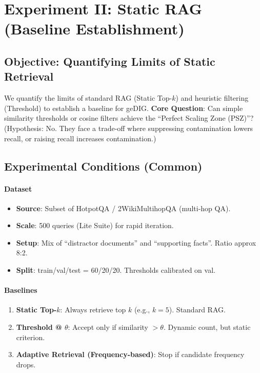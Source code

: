 \documentclass[12pt]{article}
\begin{document}
\section{Experiment II: Static RAG (Baseline Establishment)}
\label{sec:rag_experiment}

\subsection{Objective: Quantifying Limits of Static Retrieval}
We quantify the limits of standard RAG (Static Top-$k$) and heuristic filtering (Threshold) to establish a baseline for geDIG.
\textbf{Core Question}: Can simple similarity thresholds or cosine filters achieve the ``Perfect Scaling Zone (PSZ)''?
(Hypothesis: No. They face a trade-off where suppressing contamination lowers recall, or raising recall increases contamination.)

\subsection{Experimental Conditions (Common)}
\paragraph{Dataset}\;
\begin{itemize}
    \item \textbf{Source}: Subset of HotpotQA / 2WikiMultihopQA (multi-hop QA).
    \item \textbf{Scale}: 500 queries (Lite Suite) for rapid iteration.
    \item \textbf{Setup}: Mix of ``distractor documents'' and ``supporting facts''. Ratio approx 8:2.
    \item \textbf{Split}: train/val/test = 60/20/20. Thresholds calibrated on val.
\end{itemize}

\paragraph{Baselines}\;
\begin{enumerate}
    \item \textbf{Static Top-$k$}: Always retrieve top $k$ (e.g., $k=5$). Standard RAG.
    \item \textbf{Threshold @ $\theta$}: Accept only if similarity $>\theta$. Dynamic count, but static criterion.
    \item \textbf{Adaptive Retrieval (Frequency-based)}: Stop if candidate frequency drops.
\end{enumerate}
\end{document}
